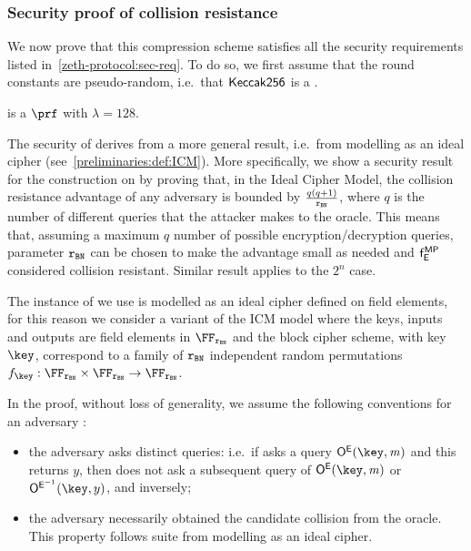 \subsubsection{Security proof of \mimcMPPrime{} collision resistance}\label{instantiation:mkhash:security:colres-proof}
We now prove that this compression scheme satisfies all the security requirements listed in~\cref{zeth-protocol:sec-req}. To do so, we first assume that the round constants are pseudo-random, i.e.~that $\mathsf{Keccak{256}}$ is a \prf{}.

\begin{lemma}
	 is a $\prf$ with $\lambda=128$.
\end{lemma}

The security of \mimcMPPrime{} derives from a more general result, i.e.~from modelling \mimcPrime{} as an ideal cipher (see~\cref{preliminaries:def:ICM}). More specifically, we show a security result for the \MP{} construction on \FFx{\rBN} by proving that, in the Ideal Cipher Model, the collision resistance advantage of any adversary is bounded by $\frac{q(q+1)}{\mathtt{r_{BN}}}$, where $q$ is the number of different queries that the attacker makes to the oracle. This means that, assuming a maximum $q$ number of possible encryption/decryption queries, parameter $\mathtt{r_{BN}}$ can be chosen to make the advantage small as needed and $\mathsf{f}_{\mathsf{E}}^{\mathsf{MP}}$ considered collision resistant. Similar result applies to the ${2^n}$ case.

The instance of \mimc{} we use is modelled as an ideal cipher defined on field elements, for this reason we consider a variant of the ICM model where the keys, inputs and outputs are field elements in $\FFx{\rBN}$ and the block cipher scheme, with key $\key$, correspond to a family of $\mathtt{r_{BN}}$ independent random permutations $f_{\key}: \FFx{\rBN} \times \FFx{\rBN} \to \FFx{\rBN}$.

In the proof, without loss of generality, we assume the following conventions for an adversary \adv{}:
\begin{itemize}
    \item the adversary asks distinct queries: i.e.~if \adv{} asks a query $\oracleEnc(\key,\msg)$ and this returns $y$, then \adv{} does not ask a subsequent query of $\oracleEnc(\key,\msg)$ or $\oracleDec(\key,y)$, and inversely;
    \item the adversary necessarily obtained the candidate collision from the oracle. This property follows suite from modelling \mimc{} as an ideal cipher.
\end{itemize}

